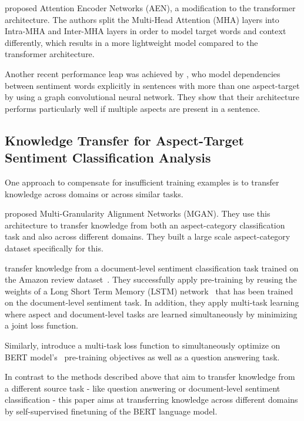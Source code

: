 \documentclass[11pt,a4paper]{article}
\newcommand{\rood}[1]{}
\begin{document}
\citet{ArxSong} proposed Attention Encoder Networks (AEN)\rood{which they test both with GloVe wordvectors as input embeddings as well as BERT embeddings (AEN-BERT).}, a modification to the 
transformer architecture. The authors split the Multi-Head Attention (MHA) layers into Intra-MHA and Inter-MHA layers in order to model target words and context differently, which results in a more lightweight model compared to the transformer architecture.

Another recent performance leap was achieved by \citet{ArxZhaoa2019}, who model dependencies between sentiment words explicitly in sentences with more than one aspect-target by using a graph convolutional neural network. They show that their architecture performs particularly well if multiple aspects are present in a sentence.

\subsection*{Knowledge Transfer for Aspect-Target Sentiment Classification Analysis}

One approach to compensate for insufficient training examples is to transfer
knowledge across domains or across similar tasks.
\rood{* General Text 
  * General Review Domain
  * General Restaurants Review}


\citet{Li} proposed Multi-Granularity Alignment Networks (MGAN). They use this architecture to transfer knowledge from both an aspect-category classification task and also across different domains. They built a large scale aspect-category dataset specifically for this. 

\citet{He} transfer knowledge from a document-level sentiment classification task trained on the Amazon review dataset~\cite{He2016}.
They successfully apply pre-training by reusing the weights of a Long Short Term Memory (LSTM) network~\cite{Hochreiter1997} that has been trained on the document-level sentiment task. In addition, they apply multi-task learning where aspect and document-level tasks are learned simultaneously by minimizing a joint loss function.

Similarly, \citet{Xu2019} introduce a multi-task loss function to simultaneously optimize on BERT model's~\cite{Devlin2019} pre-training objectives as well as a question answering task.

In contrast to the methods described above that aim to transfer knowledge from 
a different source task - like question answering or document-level sentiment classification - this paper aims at transferring knowledge across different domains by self-supervised finetuning of the BERT language model.
\end{document}
